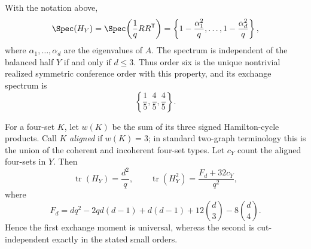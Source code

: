 \begin{theorem}
\label{thm:balanced-exchange-rigidity}
With the notation above,
\[
 \Spec(H_Y)=\Spec\!\left(\frac1qRR^{\mathsf T}\right)
 =\left\{1-\frac{\alpha_1^2}{q},\ldots,
          1-\frac{\alpha_d^2}{q}\right\},
\]
where \(\alpha_1,\ldots,\alpha_d\) are the eigenvalues of \(A\).  The
spectrum is independent of the balanced half \(Y\) if and only if
\(d\leq3\).  Thus order six is the unique nontrivial realized symmetric
conference order with this property, and its exchange spectrum is
\[
 \left\{\frac15,\frac45,\frac45\right\}.
\]

For a four-set \(K\), let \(w(K)\) be the sum of its three signed
Hamilton-cycle products.  Call \(K\) \emph{aligned} if \(w(K)=3\); in
standard two-graph terminology this is the union of the coherent and
incoherent four-set types.  Let \(c_Y\) count the aligned four-sets in
\(Y\).  Then
\[
 \operatorname{tr}(H_Y)=\frac{d^2}{q},\qquad
 \operatorname{tr}(H_Y^2)=\frac{F_d+32c_Y}{q^2},
\]
where
\[
 F_d=dq^2-2qd(d-1)+d(d-1)+12\binom d3-8\binom d4.
\]
Hence the first exchange moment is universal, whereas the second is
cut-independent exactly in the stated small orders.
\end{theorem}

